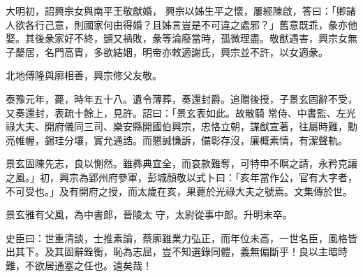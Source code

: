 \begin{pinyinscope}
 大明初，詔興宗女與南平王敬猷婚，
 興宗以姊生平之懷，屢經陳啟，答曰：「卿諸人欲各行己意，則國家何由得婚？且姊言豈是不可違之處邪？」舊意既乖，彖亦他娶。其後彖家好不終，顗又禍敗，彖等淪廢當時，孤微理盡。敬猷遇害，興宗女無子嫠居，名門高胄，多欲結姻，明帝亦敕適謝氏，興宗並不許，以女適彖。



 北地傅隆與廓相善，興宗修父友敬。



 泰豫元年，薨，時年五十八。遺令薄葬，奏還封爵。追贈後授，子景玄固辭不受，又奏還封，表疏十餘上，見許。詔曰：「景玄表如此。故散騎
 常侍、中書監、左光祿大夫、開府儀同三司、樂安縣開國伯興宗，忠恪立朝，謀猷宣著，往屬時難，勳亮帷幄，錫珪分壤，實允通誥。而懇誠慊訴，備彰存沒，廉概素情，有潔聲軌。



 景玄固陳先志，良以惻然。雖彞典宜全，而哀款難奪，可特申不瞑之請，永矜克讓之風。」初，興宗為郢州府參軍，彭城顏敬以式卜曰：「亥年當作公，官有大字者，不可受也。」及有開府之授，而太歲在亥，果薨於光祿大夫之號焉。文集傳於世。



 景玄雅有父風，為中書郎，晉陵太
 守，太尉從事中郎。升明末卒。



 史臣曰：世重清談，士推素論，蔡廓雖業力弘正，而年位未高，一世名臣，風格皆出其下。及其固辭銓衡，恥為志屈，豈不知選錄同體，義無偏斷乎！良以主暗時難，不欲居通塞之任也。遠矣哉！



\end{pinyinscope}